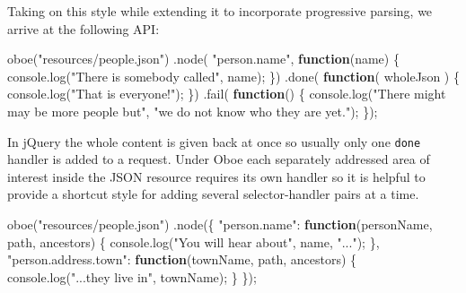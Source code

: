 \documentclass[12pt, ]{article}
\newenvironment{Shaded}{}{}
\newcommand{\KeywordTok}[1]{\textcolor[rgb]{0.00,0.44,0.13}{\textbf{{#1}}}}
\newcommand{\StringTok}[1]{\textcolor[rgb]{0.25,0.44,0.63}{{#1}}}
\newcommand{\OtherTok}[1]{\textcolor[rgb]{0.00,0.44,0.13}{{#1}}}
\newcommand{\FunctionTok}[1]{\textcolor[rgb]{0.02,0.16,0.49}{{#1}}}
\newcommand{\NormalTok}[1]{{#1}}
\begin{document}
Taking on this style while extending it to incorporate progressive
parsing, we arrive at the following API:

\begin{Shaded}
\begin{Highlighting}[]
\FunctionTok{oboe}\NormalTok{(}\StringTok{"resources/people.json"}\NormalTok{)}
   \NormalTok{.}\FunctionTok{node}\NormalTok{( }\StringTok{"person.name"}\NormalTok{, }\KeywordTok{function}\NormalTok{(name) \{}
      \OtherTok{console}\NormalTok{.}\FunctionTok{log}\NormalTok{(}\StringTok{"There is somebody called"}\NormalTok{, name);   }
   \NormalTok{\})}
   \NormalTok{.}\FunctionTok{done}\NormalTok{( }\KeywordTok{function}\NormalTok{( wholeJson ) \{}
      \OtherTok{console}\NormalTok{.}\FunctionTok{log}\NormalTok{(}\StringTok{"That is everyone!"}\NormalTok{);}
   \NormalTok{\})}
   \NormalTok{.}\FunctionTok{fail}\NormalTok{( }\KeywordTok{function}\NormalTok{() \{}
      \OtherTok{console}\NormalTok{.}\FunctionTok{log}\NormalTok{(}\StringTok{"There might may be more people but"}\NormalTok{,}
                  \StringTok{"we do not know who they are yet."}\NormalTok{);}
   \NormalTok{\});}
\end{Highlighting}
\end{Shaded}

In jQuery the whole content is given back at once so usually only one
\texttt{done} handler is added to a request. Under Oboe each separately
addressed area of interest inside the JSON resource requires its own
handler so it is helpful to provide a shortcut style for adding several
selector-handler pairs at a time.

\begin{Shaded}
\begin{Highlighting}[]
\FunctionTok{oboe}\NormalTok{(}\StringTok{"resources/people.json"}\NormalTok{)}
   \NormalTok{.}\FunctionTok{node}\NormalTok{(\{  }
      \StringTok{"person.name"}\NormalTok{: }\KeywordTok{function}\NormalTok{(personName, path, ancestors) \{}
         \OtherTok{console}\NormalTok{.}\FunctionTok{log}\NormalTok{(}\StringTok{"You will hear about"}\NormalTok{, name, }\StringTok{"..."}\NormalTok{);}
      \NormalTok{\},}
      \StringTok{"person.address.town"}\NormalTok{: }\KeywordTok{function}\NormalTok{(townName, path, ancestors) \{}
         \OtherTok{console}\NormalTok{.}\FunctionTok{log}\NormalTok{(}\StringTok{"...they live in"}\NormalTok{, townName);}
      \NormalTok{\}}
   \NormalTok{\});}
\end{Highlighting}
\end{Shaded}
\end{document}
